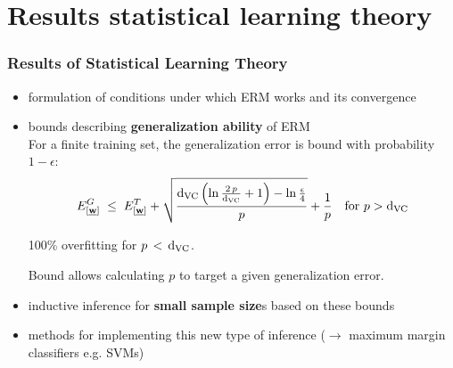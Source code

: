 \section{Results statistical learning theory}

\begin{frame}\frametitle{Results of Statistical Learning Theory}
		\begin{itemize}
			\item formulation of conditions under which ERM works and its convergence 
			\item bounds describing \textbf{generalization ability} of ERM \\
            
            For a finite training set, the generalization error is bound with probability $1-\epsilon$:
            \begin{equation}
				E^{G}_{[\underline{\mathbf{w}}]} \;\le\; E^{T}_{[\underline{\mathbf{w}}]} + \sqrt{\frac{\mathrm{d}_{\mathrm{VC}} \left(\ln \frac{2\,p}{\mathrm{d}_{\mathrm{VC}}} + 1\right)-\ln\frac{\epsilon}{4}}{p}} +\frac{1}{p} \quad \text{for } p > \mathrm{d}_{\mathrm{VC}}
				\label{eq:generalizationresults}
            \end{equation}
            
            
            
            100\% overfitting for $p\,<\,\mathrm{d}_{\mathrm{VC}}$.
            
            Bound allows calculating $p$ to target a given generalization error.
            
			\item inductive inference for \textbf{small sample size}s 
				based on these bounds
			\item methods for implementing this new type 
				of inference ($\rightarrow$ maximum margin classifiers e.g. {SVMs})
		\end{itemize}
\end{frame}

